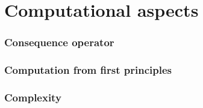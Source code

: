 \part{Computational aspects}
\section{Consequence operator}

\section{Computation from first principles}

\section{Complexity}

%

